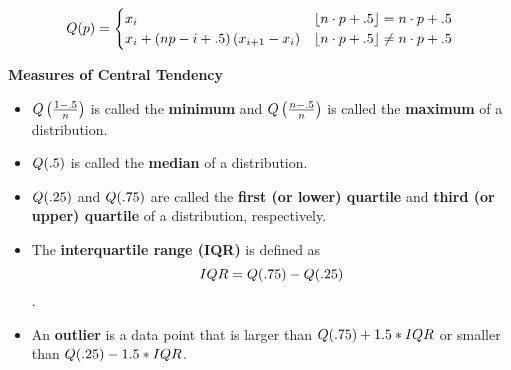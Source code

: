 \documentclass[10pt,landscape]{article}
\begin{document}
\begin{multicols}{2}
\[
      Q(p) = 
      \begin{cases}
     \small x_i & \small \lfloor n \cdot p + .5 \rfloor = n \cdot p + .5 \\
      \small x_i  +\left( n p - i + .5 \right) \left( x_{i+1} - x_i \right) &\small  \lfloor n \cdot p + .5 \rfloor \ne n \cdot p + .5 \\
      \end{cases}
\]

\textbf{Measures of Central Tendency}

\begin{itemize}
\item
  \(\small Q\left(\frac{1-.5}{n}\right)\) is called the \textbf{minimum}
  and \(\small Q\left(\frac{n-.5}{n}\right)\) is called the
  \textbf{maximum} of a distribution.
\item
  \(\small Q(.5)\) is called the \textbf{median} of a distribution.
\item
  \(\small Q(.25)\) and \(\small Q(.75)\) are called the \textbf{first
  (or lower) quartile} and \textbf{third (or upper) quartile} of a
  distribution, respectively.
\item
  The \textbf{interquartile range (IQR)} is defined as
  \[\small IQR = Q(.75) - Q(.25)\].
\item
  An \textbf{outlier} is a data point that is larger than
  \(\small Q(.75) + 1.5*IQR\) or smaller than
  \(\small Q(.25) - 1.5*IQR\).
\end{itemize}

\end{multicols}
\end{document}
